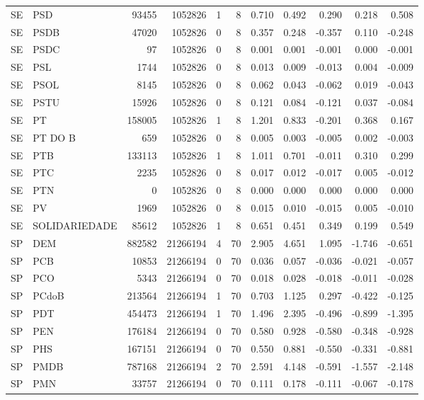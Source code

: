 \begin{landscape}
\begin{longtable}{llrrrrrrrrr}
SE & PSD & 93455 & 1052826 & 1 & 8 & 0.710 & 0.492 & 0.290 & 0.218 & 0.508 \\
SE & PSDB & 47020 & 1052826 & 0 & 8 & 0.357 & 0.248 & -0.357 & 0.110 & -0.248 \\
SE & PSDC & 97 & 1052826 & 0 & 8 & 0.001 & 0.001 & -0.001 & 0.000 & -0.001 \\
SE & PSL & 1744 & 1052826 & 0 & 8 & 0.013 & 0.009 & -0.013 & 0.004 & -0.009 \\
SE & PSOL & 8145 & 1052826 & 0 & 8 & 0.062 & 0.043 & -0.062 & 0.019 & -0.043 \\
SE & PSTU & 15926 & 1052826 & 0 & 8 & 0.121 & 0.084 & -0.121 & 0.037 & -0.084 \\
SE & PT & 158005 & 1052826 & 1 & 8 & 1.201 & 0.833 & -0.201 & 0.368 & 0.167 \\
SE & PT DO B & 659 & 1052826 & 0 & 8 & 0.005 & 0.003 & -0.005 & 0.002 & -0.003 \\
SE & PTB & 133113 & 1052826 & 1 & 8 & 1.011 & 0.701 & -0.011 & 0.310 & 0.299 \\
SE & PTC & 2235 & 1052826 & 0 & 8 & 0.017 & 0.012 & -0.017 & 0.005 & -0.012 \\
SE & PTN & 0 & 1052826 & 0 & 8 & 0.000 & 0.000 & 0.000 & 0.000 & 0.000 \\
SE & PV & 1969 & 1052826 & 0 & 8 & 0.015 & 0.010 & -0.015 & 0.005 & -0.010 \\
SE & SOLIDARIEDADE & 85612 & 1052826 & 1 & 8 & 0.651 & 0.451 & 0.349 & 0.199 & 0.549 \\
SP & DEM & 882582 & 21266194 & 4 & 70 & 2.905 & 4.651 & 1.095 & -1.746 & -0.651 \\
SP & PCB & 10853 & 21266194 & 0 & 70 & 0.036 & 0.057 & -0.036 & -0.021 & -0.057 \\
SP & PCO & 5343 & 21266194 & 0 & 70 & 0.018 & 0.028 & -0.018 & -0.011 & -0.028 \\
SP & PCdoB & 213564 & 21266194 & 1 & 70 & 0.703 & 1.125 & 0.297 & -0.422 & -0.125 \\
SP & PDT & 454473 & 21266194 & 1 & 70 & 1.496 & 2.395 & -0.496 & -0.899 & -1.395 \\
SP & PEN & 176184 & 21266194 & 0 & 70 & 0.580 & 0.928 & -0.580 & -0.348 & -0.928 \\
SP & PHS & 167151 & 21266194 & 0 & 70 & 0.550 & 0.881 & -0.550 & -0.331 & -0.881 \\
SP & PMDB & 787168 & 21266194 & 2 & 70 & 2.591 & 4.148 & -0.591 & -1.557 & -2.148 \\
SP & PMN & 33757 & 21266194 & 0 & 70 & 0.111 & 0.178 & -0.111 & -0.067 & -0.178 \\

\end{longtable}
\end{landscape}

